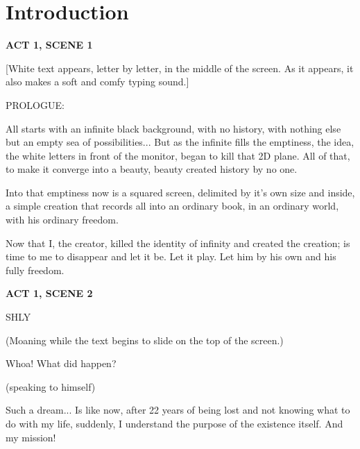\chapter{Introduction}

\textbf{ACT 1, SCENE 1}\par

[White text appears, letter by letter, in the middle of the screen. As it appears, it also makes a soft and comfy typing sound.] \par

\vspace{1cm}PROLOGUE: \par

All starts with an infinite black background, with no history, with nothing else but an empty sea of possibilities...  But as the infinite fills the emptiness, the idea, the white letters in front of the monitor, began to kill that 2D plane. All of that, to make it converge into a beauty, beauty created history by no one. \par

Into that emptiness now is a squared screen, delimited by it's own size and inside, a simple creation that records all into an ordinary book, in an ordinary world, with his ordinary freedom. \par

Now that I, the creator, killed the identity of infinity and created the creation; is time to me to disappear and let it be. Let it play. Let him by his own and his fully freedom. \par

\vspace{3cm}

\textbf{ACT 1, SCENE 2}\par
[The typing sound changes to another more light and less ominous. Also the background starts to blink slowly and softly.]

\vspace{1cm}SHLY\par
(Moaning while the text begins to slide on the top of the screen.) \par
Whoa! What did happen? \par

\vspace{0.5cm}
(speaking to himself) \par
Such a dream... Is like now, after 22 years of being lost and not knowing what to do with my life, suddenly, I understand the purpose of the existence itself. And my mission!\par

